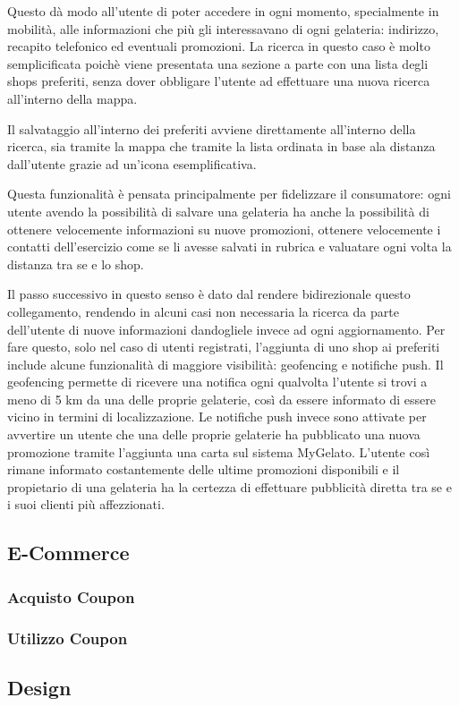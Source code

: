 Questo dà modo all'utente di poter accedere in ogni momento, specialmente in mobilità, alle informazioni che più gli interessavano di ogni gelateria: indirizzo, recapito telefonico ed eventuali promozioni.
La ricerca in questo caso è molto semplicificata poichè viene presentata una sezione a parte con una lista degli shops preferiti, senza dover obbligare l'utente ad effettuare una nuova ricerca all'interno della mappa.

Il salvataggio all'interno dei preferiti avviene direttamente all'interno della ricerca, sia tramite la mappa che tramite la lista ordinata in base ala distanza dall'utente grazie ad un'icona esemplificativa.

Questa funzionalità è pensata principalmente per fidelizzare il consumatore: ogni utente avendo la possibilità di salvare una gelateria ha anche la possibilità di ottenere velocemente informazioni su nuove promozioni, ottenere velocemente i contatti dell'esercizio come se li avesse salvati in rubrica e valuatare ogni volta la distanza tra se e lo shop.

Il passo successivo in questo senso è dato dal rendere bidirezionale questo collegamento, rendendo in alcuni casi non necessaria la ricerca da parte dell'utente di nuove informazioni dandogliele invece ad ogni aggiornamento.
Per fare questo, solo nel caso di utenti registrati, l'aggiunta di uno shop ai preferiti include alcune funzionalità di maggiore visibilità: geofencing e notifiche push.
Il geofencing permette di ricevere una notifica ogni qualvolta l'utente si trovi a meno di 5 km da una delle proprie gelaterie, così da essere informato di essere vicino in termini di localizzazione.
Le notifiche push invece sono attivate per avvertire un utente che una delle proprie gelaterie ha pubblicato una nuova promozione tramite l'aggiunta una carta sul sistema MyGelato.
L'utente così rimane informato costantemente delle ultime promozioni disponibili e il propietario di una gelateria ha la certezza di effettuare pubblicità diretta tra se e i suoi clienti più affezzionati.


\subsection{E-Commerce}

\subsubsection{Acquisto Coupon}

\subsubsection{Utilizzo Coupon}

\subsection{Design}

\newpage